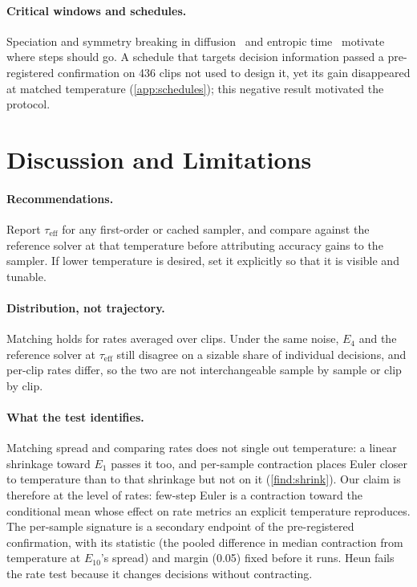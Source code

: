 \documentclass{article}
\theoremstyle{plain}
\theoremstyle{definition}
\theoremstyle{remark}
\newcommand{\taueff}{\tau_{\mathrm{eff}}}
\begin{document}
\paragraph{Critical windows and schedules.} Speciation and symmetry breaking in diffusion~\citep{biroli2024dynamical,raya2023ssb} and entropic time~\citep{stancevic2025entropic} motivate where steps should go. A schedule that targets decision information passed a pre-registered confirmation on 436 clips not used to design it, yet its gain disappeared at matched temperature (\cref{app:schedules}); this negative result motivated the protocol.

\section{Discussion and Limitations}
\label{sec:discussion}
\paragraph{Recommendations.} Report $\taueff$ for any first-order or cached sampler, and compare against the reference solver at that temperature before attributing accuracy gains to the sampler. If lower temperature is desired, set it explicitly so that it is visible and tunable.
\paragraph{Distribution, not trajectory.} Matching holds for rates averaged over clips. Under the same noise, $E_4$ and the reference solver at $\taueff$ still disagree on a sizable share of individual decisions, and per-clip rates differ, so the two are not interchangeable sample by sample or clip by clip.
\paragraph{What the test identifies.} Matching spread and comparing rates does not single out temperature: a linear shrinkage toward $E_1$ passes it too, and per-sample contraction places Euler closer to temperature than to that shrinkage but not on it (\cref{find:shrink}). Our claim is therefore at the level of rates: few-step Euler is a contraction toward the conditional mean whose effect on rate metrics an explicit temperature reproduces. The per-sample signature is a secondary endpoint of the pre-registered confirmation, with its statistic (the pooled difference in median contraction from temperature at $E_{10}$'s spread) and margin (0.05) fixed before it runs. Heun fails the rate test because it changes decisions without contracting.
\end{document}
